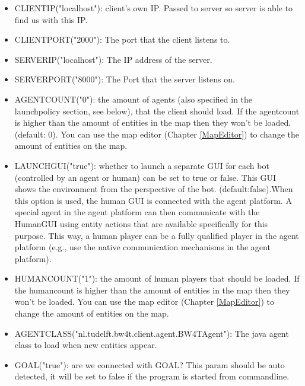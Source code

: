 \documentclass[11pt,a4paper]{article}
\begin{document}
\begin{itemize}
\item

    CLIENTIP("localhost"):    client's own IP. Passed to server so server is able to find us with this IP. 

\item
    CLIENTPORT("2000"):   The port that the client listens to. 


\item
    SERVERIP("localhost"):
 The IP address of the server. 
  
\item
    SERVERPORT("8000"):
   The Port that the server listens on. 

\item
    AGENTCOUNT("0"):
 the amount of agents (also specified in the launchpolicy section, see below), that the client should load. If the agentcount is higher than the amount of entities in the map then they won't be loaded. (default: 0). You can use the map editor (Chapter \ref{MapEditor}) to change the amount of entities on the map. 
    
\item
    LAUNCHGUI("true"):
    whether to launch a separate GUI for each bot (controlled by an agent or human) can be set to true or false. This GUI shows the environment from the perspective of the bot. (default:false).When this option is used, the human GUI is connected with the agent platform. A special agent in the agent platform can then communicate with the HumanGUI using entity actions that are available specifically for this purpose. This way, a human player can be a fully qualified player in the agent platform (e.g., use the native communication mechanisms in the agent platform).


\item
    HUMANCOUNT("1"):
    the amount of human players that should be loaded. If the humancount is higher than the amount of entities in the map then they won't be loaded. You can use the map editor (Chapter \ref{MapEditor}) to change the amount of entities on the map. 

\item
    AGENTCLASS("nl.tudelft.bw4t.client.agent.BW4TAgent"):
    The java agent class to load when new entities appear.
   

\item
    GOAL("true"):
    are we connected with GOAL? This param should be auto detected, it will be set to false if the program is started from commandline.


\end{itemize}
\end{document}
